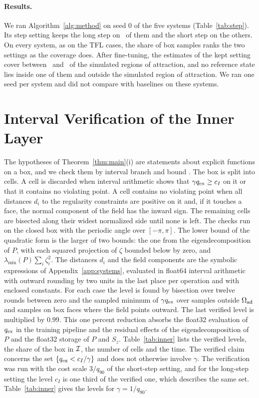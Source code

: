 \paragraph{Results.} We ran Algorithm~\ref{alg:method} on seed 0 of the five systems (Table~\ref{tab:step}). Its step setting keeps the long step on \resStepBenchLong\ of them and the short step on the others. On every system, as on the TFL cases, the share of box samples ranks the two settings as the coverage does. After fine-tuning, the estimates of the kept setting cover between \resStepBenchCovMin\ and \resStepBenchCovMax\ of the simulated regions of attraction, and no reference state lies inside one of them and outside the simulated region of attraction. We ran one seed per system and did not compare with baselines on these systems.



\section{Interval Verification of the Inner Layer}\label{app:inner}
The hypotheses of Theorem~\ref{thm:main}(i) are statements about explicit functions on a box, and we check them by interval branch and bound \citep{moore2009}. The box is split into cells. A cell is discarded when interval arithmetic shows that $\gamma q_{\mathrm{ex}}\ge c_I$ on it or that it contains no violating point. A cell contains no violating point when all distances $d_i$ to the regularity constraints are positive on it and, if it touches a face, the normal component of the field has the inward sign. The remaining cells are bisected along their widest normalized side until none is left. The checks run on the closed box with the periodic angle over $[-\pi,\pi]$. The lower bound of the quadratic form is the larger of two bounds: the one from the eigendecomposition of $P$, with each squared projection of $\zeta$ bounded below by zero, and $\lambda_{\min}(P)\sum_i\zeta_i^2$. The distances $d_i$ and the field components are the symbolic expressions of Appendix~\ref{app:systems}, evaluated in float64 interval arithmetic with outward rounding by two units in the last place per operation and with enclosed constants. For each case the level is found by bisection over twelve rounds between zero and the sampled minimum of $\gamma q_{\mathrm{ex}}$ over samples outside $\Omega_{\mathrm{ad}}$ and samples on box faces where the field points outward. The last verified level is multiplied by $0.99$. This one percent reduction absorbs the float32 evaluation of $q_{\mathrm{ex}}$ in the training pipeline and the residual effects of the eigendecomposition of $P$ and the float32 storage of $P$ and $S_z$. Table~\ref{tab:inner} lists the verified levels, the share of the box in $\mathcal I$, the number of cells and the time.
The verified claim concerns the set $\{q_{\mathrm{ex}}<c_I/\gamma\}$ and does not otherwise involve $\gamma$. The verification was run with the cost scale $3/q_{90}$ of the short-step setting, and for the long-step setting the level $c_I$ is one third of the verified one, which describes the same set. Table~\ref{tab:inner} gives the levels for $\gamma=1/q_{90}$.


